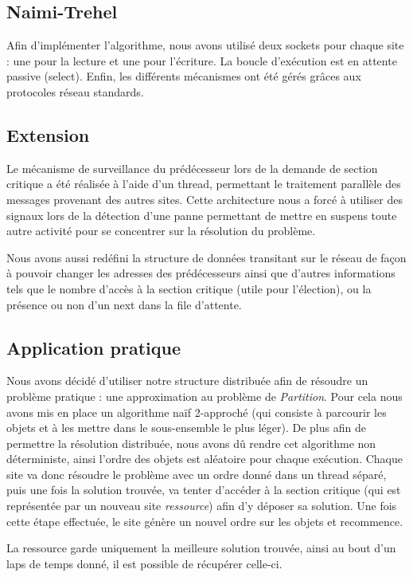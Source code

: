 \subsection{Naimi-Trehel}
Afin d'implémenter l'algorithme, nous avons utilisé deux sockets pour chaque site : une pour la lecture et une pour l'écriture. La boucle d'exécution est en attente passive (select). Enfin, les différents mécanismes ont été gérés grâces aux protocoles réseau standards.

\subsection{Extension}
Le mécanisme de surveillance du prédécesseur lors de la demande de section critique a été réalisée à l'aide d'un thread, permettant le traitement parallèle des messages provenant des autres sites. Cette architecture nous a forcé à utiliser des signaux lors de la détection d'une panne permettant de mettre en suspens toute autre activité pour se concentrer sur la résolution du problème. 

Nous avons aussi redéfini la structure de données transitant sur le réseau de façon à pouvoir changer les adresses des prédécesseurs ainsi que d'autres informations tels que le nombre d'accès à la section critique (utile pour l'élection), ou la présence ou non d'un next dans la  file d'attente.


\subsection{Application pratique}
Nous avons décidé d'utiliser notre structure distribuée afin de résoudre un problème pratique : une approximation au problème de {\em Partition}.
Pour cela nous avons mis en place un algorithme naïf 2-approché (qui consiste à parcourir les objets et à les mettre dans le sous-ensemble le plus léger).
De plus afin de permettre la résolution distribuée, nous avons dû rendre cet algorithme non déterministe, ainsi l'ordre des objets est aléatoire pour chaque exécution.
Chaque site va donc résoudre le problème avec un ordre donné dans un thread séparé, puis une fois la solution trouvée, va tenter d'accéder à la section critique (qui est représentée par un nouveau site {\em ressource}) afin d'y déposer sa solution.
Une fois cette étape effectuée, le site génère un nouvel ordre sur les objets et recommence.

La ressource garde uniquement la meilleure solution trouvée, ainsi au bout d'un laps de temps donné, il est possible de récupérer celle-ci.



